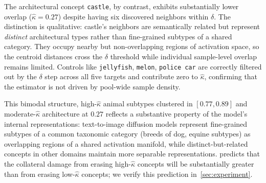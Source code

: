 The architectural concept \texttt{castle}, by contrast, exhibits substantially lower overlap ($\hat\kappa = 0.27$) despite having six discovered neighbors within $\delta$. The distinction is qualitative: castle's neighbors are semantically related but represent \emph{distinct} architectural types rather than fine-grained subtypes of a shared category. They occupy nearby but non-overlapping regions of activation space, so the centroid distances cross the $\delta$ threshold while individual sample-level overlap remains limited. Controls like \texttt{jellyfish}, \texttt{melon}, \texttt{police car} are correctly filtered out by the $\delta$ step across all five targets and contribute zero to $\hat\kappa$, confirming that the estimator is not driven by pool-wide sample density.

This bimodal structure, high-$\hat\kappa$ animal subtypes clustered in $[0.77, 0.89]$ and moderate-$\hat\kappa$ architecture at $0.27$ reflects a substantive property of the model's internal representations: text-to-image diffusion models represent fine-grained subtypes of a common taxonomic category (breeds of dog, equine subtypes) as overlapping regions of a shared activation manifold, while distinct-but-related concepts in other domains maintain more separable representations.  predicts that the collateral damage from erasing high-$\hat\kappa$ concepts will be substantially greater than from erasing low-$\hat\kappa$ concepts; we verify this prediction in~\cref{sec:experiment}.

